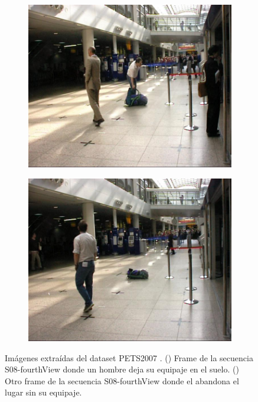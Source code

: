 \begin{figure}[ht]
  \centering
  \begin{subfigure}[b]{0.4\textwidth}
    \includegraphics[width=\textwidth]{img/chapters/resultados/datasets/pets2007_1.jpg}
    \caption{}
    \label{fig:pets2007_1}
  \end{subfigure}
  \qquad\qquad
  \begin{subfigure}[b]{0.4\textwidth}
    \includegraphics[width=\textwidth]{img/chapters/resultados/datasets/pets2007_2.jpg}
    \caption{}
    \label{fig:pets2007_2}
  \end{subfigure}
  \caption{Imágenes extraídas del dataset PETS2007 \cite{pets2007-dataset}.
    (\protect{}) Frame de la secuencia S08-fourthView donde un hombre deja su equipaje en el suelo.
    (\protect{}) Otro frame de la secuencia S08-fourthView donde el abandona el lugar sin su equipaje.}
  \label{fig:pets2007_S08}
\end{figure}

